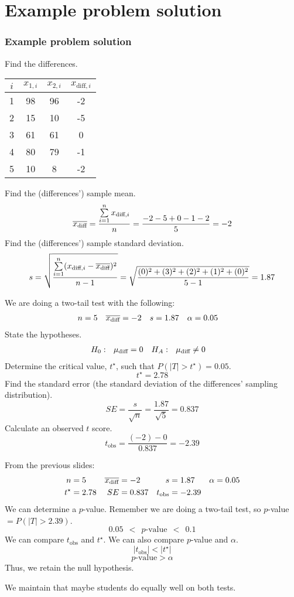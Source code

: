 \documentclass[11pt,containsverbatim,handout]{beamer}
\begin{document}
\section{Example problem solution}
\begin{frame}
\frametitle{Example problem solution}
Find the differences. \pause
\begin{center}
\begin{tabular}{|c|c|c|c|} \hline
$i$    & $x_{1,i}$ & $x_{2,i}$ & $x_{\text{diff},i}$ \\ \hline
1   & 98     & 96     & -2\\  
2   & 15     & 10     & -5\\  
3   & 61     & 61     &  0\\  
4   & 80     & 79     & -1\\  
5   & 10     & 8      & -2\\  \hline
\end{tabular}
\end{center} \pause
Find the (differences') sample mean. \pause
$$\overline{x_\text{diff}} = \frac{\sum\limits_{i=1}^n x_{\text{diff},i}}{n} = \frac{-2-5+0-1-2}{5} = -2 $$ \pause
Find the (differences') sample standard deviation. \pause
$$s = \sqrt{\frac{\sum\limits_{i=1}^n (x_{\text{diff},i}-\overline{x_\text{diff}})^2}{n-1}} = \sqrt{\frac{(0)^2+(3)^2+(2)^2+(1)^2+(0)^2}{5-1}} = 1.87 $$
\end{frame}


\begin{frame}
We are doing a two-tail test with the following:
\begin{align*}
n &=5 & \overline{x_\text{diff}} &= -2 & s&= 1.87 & \alpha &= 0.05
\end{align*} \pause
State the hypotheses. \pause
\begin{align*}
H_0&:~~ \mu_\text{diff} = 0 & H_A&:~~ \mu_\text{diff} \ne 0
\end{align*} \pause
Determine the critical value, $t^\star$, such that $P(|T|>t^\star) = 0.05$. \pause
$$t^\star = 2.78 $$ \pause
Find the standard error (the standard deviation of the differences' sampling distribution). \pause
$$SE = \frac{s}{\sqrt{n}} = \frac{1.87}{\sqrt{5}} = 0.837 $$ \pause
Calculate an observed $t$ score. \pause
$$t_\text{obs} = \frac{(-2)-0}{0.837} = -2.39 $$
\end{frame}

\begin{frame}
From the previous slides:
\begin{align*}
n &=5 & \overline{x_\text{diff}} &= -2 & s&= 1.87 & \alpha &= 0.05 \\
t^\star &= 2.78 & SE &= 0.837 & t_\text{obs} &= -2.39
\end{align*} \pause
We can determine a $p$-value. Remember we are doing a two-tail test, so $p$-value $= P(|T|>2.39)$.\pause
$$0.05 ~~<~~ p\text{-value} ~~<~~ 0.1  $$\pause
We can compare $t_\text{obs}$ and $t^\star$. We can also compare $p$-value and $\alpha$.\pause
$$|t_\text{obs}| < |t^\star| $$\pause
$$p\text{-value} > \alpha $$\pause
Thus, we retain the null hypothesis. \pause
\begin{center}
We maintain that maybe students do equally well on both tests.
\end{center}
\end{frame}
\end{document}
